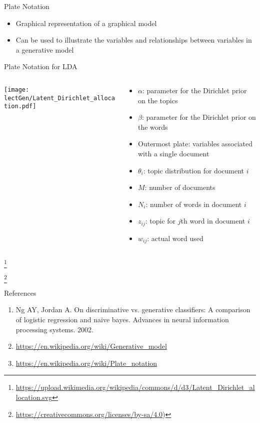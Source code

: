 \documentclass[aspectratio=169]{beamer}
\begin{document}
\begin{frame}{Plate Notation}

\begin{itemize}
	\item Graphical representation of a graphical model
	\item Can be used to illustrate the variables and relationships between variables in a generative model
\end{itemize}
\end{frame}
\begin{frame}{Plate Notation for LDA}

\begin{columns}
\begin{column}{0.5\textwidth}	
	\texttt{[image: lectGen/Latent\_Dirichlet\_allocation.pdf]}
\end{column}
\begin{column}{0.5\textwidth}
{\footnotesize{
\begin{itemize}
	\item $\alpha$: parameter for the Dirichlet prior on the topics
	\item $\beta$: parameter for the Dirichlet prior on the words
	\item Outermost plate: variables associated with a single document
	\item $\theta_i$: topic distribution for document $i$
	\item $M$: number of documents
	\item $N_i$: number of words in document $i$
	\item $z_{ij}$: topic for $j$th word in document $i$
	\item $w_{ij}$: actual word used
\end{itemize}
}}
\end{column}
\end{columns}

	\footnote{\url{https://upload.wikimedia.org/wikipedia/commons/d/d3/Latent\_Dirichlet\_allocation.svg}}
	
	\footnote{\url{https://creativecommons.org/licenses/by-sa/4.0})}
\end{frame}
\begin{frame}{References}
\begin{enumerate}
\item	Ng AY, Jordan A. On discriminative vs. generative classifiers: A comparison of logistic regression and naive bayes. Advances in neural information processing systems. 2002.
\item \url{https://en.wikipedia.org/wiki/Generative_model}
\item \url{https://en.wikipedia.org/wiki/Plate_notation}
\end{enumerate}
\end{frame}
\end{document}
